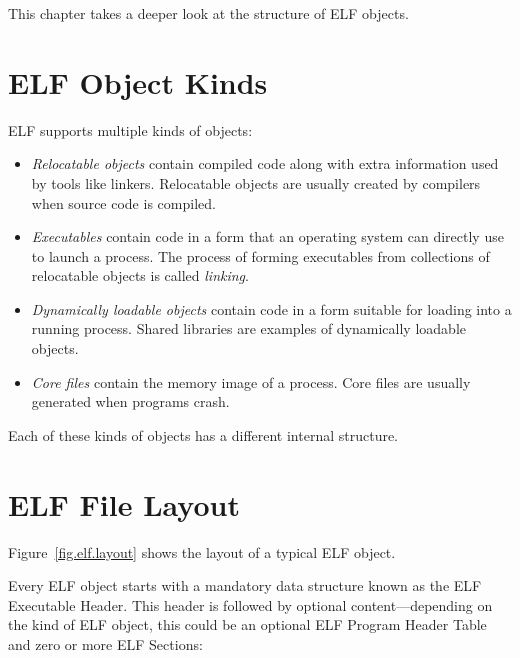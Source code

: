 \documentclass[a4paper,pdftex]{book}
\newcommand{\firstterm}[1]{\textit{#1}}
\newcommand{\elfdatastructure}[1]{\textsf{#1}}
\begin{document}
This chapter takes a deeper look at the structure of ELF objects.

\section{ELF Object Kinds}
ELF supports multiple kinds of objects:

\begin{itemize}
\item \firstterm{Relocatable objects}
  contain compiled code along with extra information used by tools
  like linkers. Relocatable objects are usually created by compilers
  when source code is compiled.
\item \firstterm{Executables} contain
  code in a form that an operating system can directly use to launch a
  process.  The process of forming executables from collections of
  relocatable objects is called
  \firstterm{linking}.
\item \firstterm{Dynamically loadable objects} contain code in a form suitable for
  loading into a running process. Shared
  libraries are examples of dynamically loadable
  objects.
\item \firstterm{Core files} contain the memory
  image of a process. Core files are usually generated when programs
  crash.
\end{itemize}

Each of these kinds of objects has a different internal structure.

\section{ELF File Layout}

Figure~\vref{fig.elf.layout} shows the layout of a typical ELF
object.

Every ELF object starts with a mandatory data structure known as the
ELF \elfdatastructure{Executable Header}.
This header is followed by optional content---depending on the kind of
ELF object, this could be an optional ELF \elfdatastructure{Program
  Header Table} and zero or more ELF
\elfdatastructure{Sections}:
\end{document}
